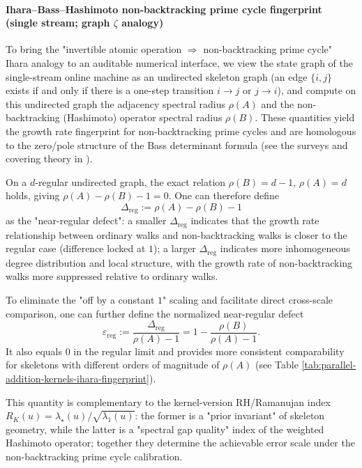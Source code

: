 \paragraph{Ihara--Bass--Hashimoto non-backtracking prime cycle fingerprint (single stream; graph \texorpdfstring{$\zeta$}{zeta} analogy)}
To bring the "invertible atomic operation $\Rightarrow$ non-backtracking prime cycle" Ihara analogy to an auditable numerical interface, we view the state graph of the single-stream online machine as an undirected skeleton graph (an edge $\{i,j\}$ exists if and only if there is a one-step transition $i\to j$ or $j\to i$), and compute on this undirected graph the adjacency spectral radius $\rho(A)$ and the non-backtracking (Hashimoto) operator spectral radius $\rho(B)$. These quantities yield the growth rate fingerprint for non-backtracking prime cycles and are homologous to the zero/pole structure of the Bass determinant formula (see the surveys and covering theory in \cite{TerrasZetaGraphs,StarkTerras1996GraphCoverings}).


\begin{remark}\label{rem:ihara-delta-reg}
On a $d$-regular undirected graph, the exact relation \(\rho(B)=d-1\), \(\rho(A)=d\) holds, giving \(\rho(A)-\rho(B)-1=0\).
One can therefore define
$$
\Delta_{\mathrm{reg}}:=\rho(A)-\rho(B)-1
$$
as the "near-regular defect": a smaller \(\Delta_{\mathrm{reg}}\) indicates that the growth rate relationship between ordinary walks and non-backtracking walks is closer to the regular case (difference locked at \(1\)); a larger \(\Delta_{\mathrm{reg}}\) indicates more inhomogeneous degree distribution and local structure, with the growth rate of non-backtracking walks more suppressed relative to ordinary walks.

To eliminate the "off by a constant \(1\)" scaling and facilitate direct cross-scale comparison, one can further define the normalized near-regular defect
\[
\varepsilon_{\mathrm{reg}}
:=\frac{\Delta_{\mathrm{reg}}}{\rho(A)-1}
=1-\frac{\rho(B)}{\rho(A)-1}.
\]
It also equals \(0\) in the regular limit and provides more consistent comparability for skeletons with different orders of magnitude of \(\rho(A)\) (see Table \ref{tab:parallel-addition-kernels-ihara-fingerprint}).

This quantity is complementary to the kernel-version RH/Ramanujan index \(R_K(u)=\lambda_\star(u)/\sqrt{\lambda_1(u)}\): the former is a "prior invariant" of skeleton geometry, while the latter is a "spectral gap quality" index of the weighted Hashimoto operator; together they determine the achievable error scale under the non-backtracking prime cycle calibration.
\end{remark}

